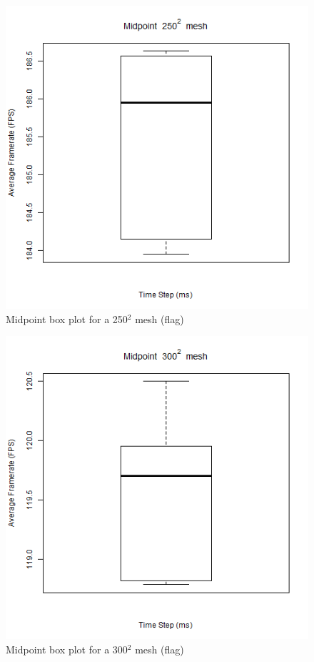       \begin{figure}
    \begin{center}
      \includegraphics[scale=.9]{Figures/flag_m_250_box}
    \end{center}
    \caption{Midpoint box plot for a 250$^{2}$ mesh (flag)}
    \label{fig:m box 250 flag}
  \end{figure}
  
      \begin{figure}
    \begin{center}
      \includegraphics[scale=.9]{Figures/flag_m_300_box}
    \end{center}
    \caption{Midpoint box plot for a 300$^{2}$ mesh (flag)}
    \label{fig:m box 300 flag}
  \end{figure}

